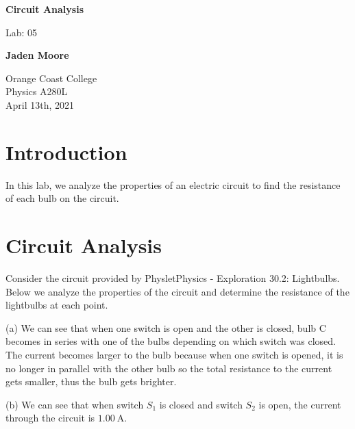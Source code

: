 \documentclass[12pt]{article}
\begin{document}

\begin{titlepage}
    \begin{center}
        \vspace*{1cm}
        \textbf{Circuit Analysis}

        \vspace{0.5cm}
        Lab: 05

        \vspace{1cm}

        \textbf{Jaden Moore}

        \vfill

        Orange Coast College\\
        Physics A280L\\
        April 13th, 2021

    \end{center}
\end{titlepage}

\pagestyle{fancy}
\fancyhf{}
\setlength{\headheight}{15pt}
\cfoot{\thepage}

\section{Introduction}
In this lab, we analyze the properties of an electric circuit to find the resistance of each bulb on the circuit.

\section{Circuit Analysis}
Consider the circuit provided by Physlet\textregistered \space Physics - Exploration 30.2: Lightbulbs. Below we analyze the properties of the circuit and determine the resistance of the lightbulbs at each point.

\bigskip

(a) We can see that when one switch is open and the other is closed, bulb C becomes in series with one of the bulbs depending on which switch was closed. The current becomes larger to the bulb because when one switch is opened, it is no longer in parallel with the other bulb so the total resistance to the current gets smaller, thus the bulb gets brighter.

\bigskip

(b) We can see that when switch $S_1$ is closed and switch $S_2$ is open, the current through the circuit is $\SI{1.00}{\ampere}$.
\end{document}
